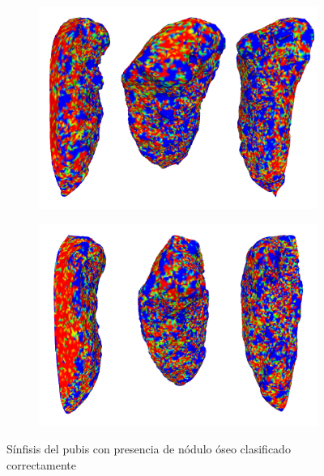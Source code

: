 \begin{figure}[p]
    \centering
    \begin{subfigure}{\textwidth}  
    \includegraphics[width=\textwidth]{imagenes/experiments/bone117_heat.png}
    \end{subfigure}
    \centering
    \begin{subfigure}{\textwidth}
    \includegraphics[width=\textwidth]{imagenes/experiments/bone161_heat.png}
    \end{subfigure}
    \caption[Nódulo óseo presente, mapas de activación]{Sínfisis del pubis con presencia de nódulo óseo clasificado correctamente}
    \label{fig:heatmap_present}
\end{figure}

